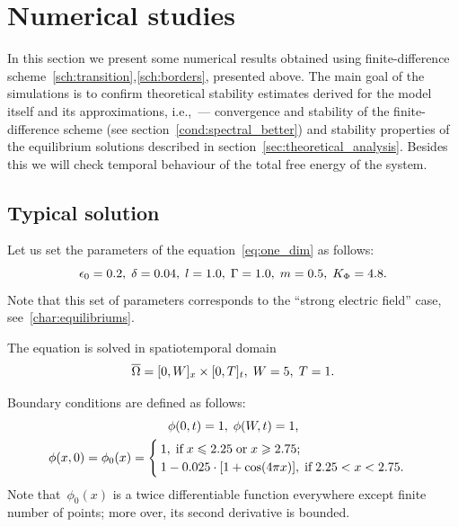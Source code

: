 
\section{Numerical studies}

In this section we present some numerical results
obtained using finite-difference
scheme~\eqref{sch:transition},\eqref{sch:borders},
presented above. The main goal of the simulations is to confirm
theoretical stability estimates derived for the model itself and its
approximations,
i.e.,~--- convergence and stability  of the finite-difference scheme
(see section~\eqref{cond:spectral_better})
and
stability properties of the equilibrium solutions
described in section~\ref{sec:theoretical_analysis}.
Besides this we will check temporal behaviour of the
total free energy of the system.

\subsection{Typical solution}

Let us set the parameters of the equation~\eqref{eq:one_dim} as follows:
\begin{equation}
	\epsilon_0 = 0.2, \; \delta = 0.04, \; l = 1.0, \; \Gamma = 1.0, \; m = 0.5, \; K_\Phi = 4.8 {\text{.}}
	\label{exp:parameters}
\end{equation}
Note that this set of parameters corresponds to the ``strong electric
field'' case, see~\eqref{char:equilibriums}.

The equation is solved in spatiotemporal domain
\begin{equation}
	{\overline{\Omega}} = [0, W]_x \times [0, T]_t, \; W = 5, \; T = 1 {\text{.}}
	\label{exp:set}
\end{equation}

Boundary conditions are defined as follows:
\begin{equation}
\begin{gathered}
  \phi(0, t) = 1, \; \phi(W, t) = 1 {\text{,}} \\
  \phi(x, 0) = \phi_0(x) = \begin{cases}
    1, \; \text{if} \; x \leqslant 2.25 \; \text{or} \; x \geqslant 2.75 {\text{;}} \\
    1 - 0.025 \cdot [1 + \cos(4 \pi x)], \; \text{if} \; 2.25 < x < 2.75 {\text{.}}
  \end{cases}
\end{gathered} \label{exp:borders}
\end{equation}
Note that~$\phi_0(x)$ is a twice differentiable function everywhere
except finite number of points; more over, its second derivative is bounded.

